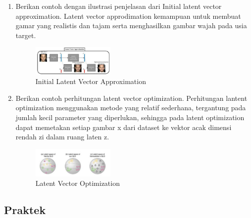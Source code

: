 \begin{enumerate}
        \item Berikan contoh dengan ilustrasi penjelasan dari Initial latent vector approximation.
		Latent vector approdimation kemampuan untuk membuat gamar yang realistis dan tajam serta menghasilkan gambar wajah pada usia target.
		\begin{figure}[H]
			\includegraphics[width=4cm]{figures/1174039/chapter9/teori10.PNG}
            	\centering
           	 \caption{Initial Latent Vector Approximation}
       	\end{figure}

        \item Berikan contoh perhitungan latent vector optimization.
		Perhitungan lantent optimization menggunakan metode yang relatif sederhana, tergantung pada jumlah kecil parameter yang diperlukan, sehingga pada latent optimization dapat memetakan setiap gambar x dari dataset ke vektor acak dimensi rendah zi dalam ruang laten z.
		\begin{figure}[H]
			\includegraphics[width=4cm]{figures/1174039/chapter9/teori11.PNG}
            	\centering
           	\caption{Latent Vector Optimization}
        \end{figure}
           
\end{enumerate}

\subsection{Praktek}

